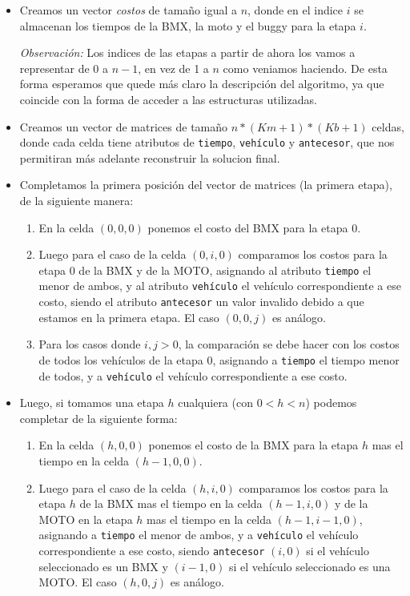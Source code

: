 \begin{itemize}
\item Creamos un vector \textit{costos} de tamaño igual a $n$, donde en el indice $i$ se almacenan los
      tiempos de la BMX, la moto y el buggy para la etapa $i$.

      \textit{Observación:} Los indices de las etapas a partir de ahora los vamos a representar de 0 a $n-1$, en vez de 1 a $n$ como veniamos haciendo. De esta forma esperamos que quede más claro la descripción del algoritmo, ya que coincide con la forma de acceder a las estructuras utilizadas.

\item Creamos un vector de matrices de tamaño $n*(Km+1)*(Kb+1)$ celdas, donde cada celda tiene atributos de \texttt{tiempo}, \texttt{vehículo} y \texttt{antecesor}, que nos permitiran más adelante reconstruir la solucion final.
\item Completamos la primera posición del vector de matrices (la primera etapa), de la siguiente manera:
  \begin{enumerate}
  	\item En la celda $(0,0,0)$ ponemos el costo del BMX para la etapa 0.
    \item Luego para el caso de la celda $(0,i,0)$ comparamos los costos para la etapa 0 de la BMX y de la MOTO, asignando al atributo \texttt{tiempo} el menor de ambos, y al atributo \texttt{vehículo} el vehículo correspondiente a ese costo, siendo el atributo \texttt{antecesor} un valor invalido debido a que estamos en la primera etapa. El caso $(0,0,j)$ es análogo.
    \item Para los casos donde $i,j > 0$, la comparación se debe hacer con los costos de todos los vehículos de la etapa 0, asignando a \texttt{tiempo} el tiempo menor de todos, y a \texttt{vehículo} el vehículo correspondiente a ese costo.
  \end{enumerate}
\item Luego, si tomamos una etapa $h$ cualquiera (con $0< h < n$) podemos completar de la siguiente forma:
  \begin{enumerate}
	\item En la celda $(h,0,0)$ ponemos el costo de la BMX para la etapa $h$ mas el tiempo en la celda $(h-1,0,0)$.
    \item Luego para el caso de la celda $(h,i,0)$ comparamos los costos para la etapa $h$ de la BMX mas el tiempo en la celda $(h-1,i,0)$ y de la MOTO en la etapa $h$ mas el tiempo en la celda $(h-1,i-1,0)$, asignando a \texttt{tiempo} el menor de ambos, y a \texttt{vehículo} el vehículo correspondiente a ese costo, siendo \texttt{antecesor} $(i,0)$ si el vehículo seleccionado es un BMX y $(i-1,0)$ si el vehículo seleccionado es una MOTO. El caso $(h,0,j)$ es análogo.

\end{enumerate}
\end{itemize}
